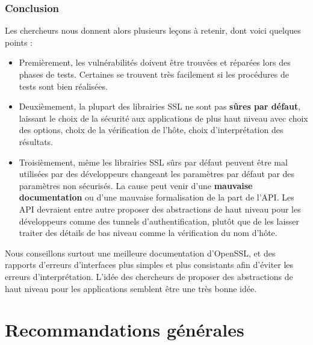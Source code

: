 		\subsubsection{Conclusion}

			Les chercheurs nous donnent alors plusieurs leçons à retenir, dont voici quelques points :
			\begin{itemize}
			\item Premièrement, les vulnérabilités doivent être trouvées et réparées lors des phases de tests. Certaines se trouvent très facilement si les procédures de tests sont bien réalisées. 
			\item Deuxièmement, la plupart des librairies SSL ne sont pas \textbf{sûres par défaut}, laissant le choix de la sécurité aux applications de plus haut niveau avec choix des options, choix de la vérification de l'hôte, choix d'interprétation des résultats.
			\item Troisièmement, même les librairies SSL sûrs par défaut peuvent être mal utilisées par des développeurs changeant les paramètres par défaut par des paramètres non sécurisés. La cause peut venir d'une \textbf{mauvaise documentation} ou d'une mauvaise formalisation de la part de l'API. Les API devraient entre autre proposer des abstractions de haut niveau pour les développeurs comme des tunnels d'authentification, plutôt que de les laisser traiter des détails de bas niveau comme la vérification du nom d'hôte.\\
			\end{itemize}

			Nous conseillons surtout une meilleure documentation d'OpenSSL, et des rapports d'erreurs d'interfaces plus simples et plus consistants afin d'éviter les erreurs d'interprétation. L'idée des chercheurs de proposer des abstractions de haut niveau pour les applications semblent être une très bonne idée.
		

\section{Recommandations générales}